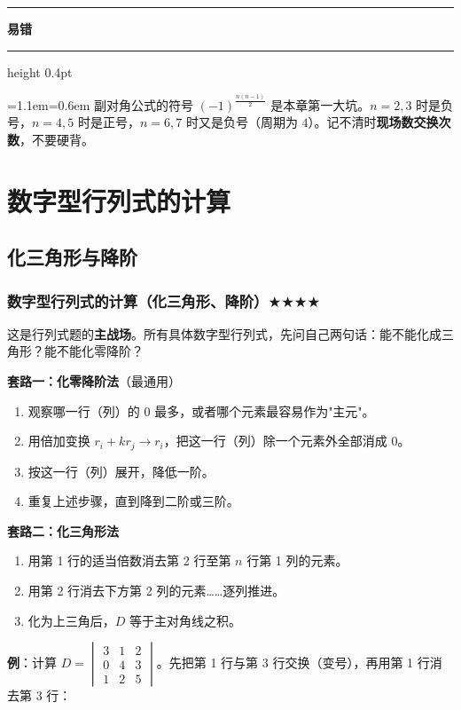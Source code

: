 \documentclass[11pt,openany,UTF8]{ctexbook}
\newcommand{\callouthead}[2]{%
  \par\addvspace{7pt}\noindent
  {\color{#1}\rule[-0.15em]{3pt}{1.05em}}\hspace{0.5em}%
  {\bfseries\color{#1}#2}\par\nobreak\vspace{-0.35em}%
  {\color{rulesep}\hrule height 0.4pt}\nobreak\vspace{0.45em}%
  \begingroup\small\setlength{\parindent}{0pt}%
  \leftskip=1.1em\rightskip=0.6em\noindent\ignorespaces}
\newcommand{\calloutend}{\par\endgroup\addvspace{7pt}}
\newenvironment{callwarn}[1]{\callouthead{warnbar}{#1}}{\calloutend}
\begin{document}
\begin{callwarn}{易错}
副对角公式的符号 $(-1)^{\frac{n(n-1)}{2}}$ 是本章第一大坑。$n=2,3$ 时是负号，$n=4,5$ 时是正号，$n=6,7$ 时又是负号（周期为 $4$）。记不清时\textbf{现场数交换次数}，不要硬背。

\end{callwarn}

\section{数字型行列式的计算}

\subsection{化三角形与降阶}

\subsubsection{数字型行列式的计算（化三角形、降阶）$\bigstar$$\bigstar$$\bigstar$$\bigstar$}

这是行列式题的\textbf{主战场}。所有具体数字型行列式，先问自己两句话：能不能化成三角形？能不能化零降阶？

\textbf{套路一：化零降阶法}（最通用）

\begin{enumerate}
\item 观察哪一行（列）的 $0$ 最多，或者哪个元素最容易作为"主元"。
\item 用倍加变换 $r_i+kr_j\to r_i$，把这一行（列）除一个元素外全部消成 $0$。
\item 按这一行（列）展开，降低一阶。
\item 重复上述步骤，直到降到二阶或三阶。
\end{enumerate}
\textbf{套路二：化三角形法}

\begin{enumerate}
\item 用第 1 行的适当倍数消去第 2 行至第 $n$ 行第 1 列的元素。
\item 用第 2 行消去下方第 2 列的元素……逐列推进。
\item 化为上三角后，$D$ 等于主对角线之积。
\end{enumerate}
\textbf{例}：计算 $D=\begin{vmatrix}3&1&2\\0&4&3\\1&2&5\end{vmatrix}$。先把第 1 行与第 3 行交换（变号），再用第 1 行消去第 3 行：
\end{document}
